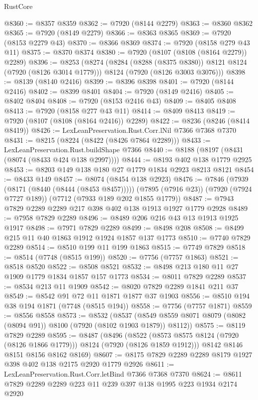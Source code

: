 \begin{lexlean}{RustCore}
\begin{coremodule}
@8360 := @8357 @8359
@8362 := @7920 (@8144 @2279)
@8363 := @8360 @8362
@8365 := @7920 (@8149 @2279)
@8366 := @8363 @8365
@8369 := @7920 (@8153 @2279 @43)
@8370 := @8366 @8369
@8374 := @7920 (@8158 @279 @43 @11)
@8375 := @8370 @8374
@8380 := @7920 (@8107 (@8108 (@8164 @2279)) @2289)
@8396 := @8253
    (@8274
      (@8284 (@8288 (@8375 @8380)) @8121 @8124 (@7920 (@8126 @3014 @1779)))
      @8124
      (@7920 (@8126 @3003 @3076)))
@8398 := @8139 (@8140 @2416)
@8399 := @8396 @8398
@8401 := @7920 (@8144 @2416)
@8402 := @8399 @8401
@8404 := @7920 (@8149 @2416)
@8405 := @8402 @8404
@8408 := @7920 (@8153 @2416 @43)
@8409 := @8405 @8408
@8413 := @7920 (@8158 @277 @43 @11)
@8414 := @8409 @8413
@8419 := @7920 (@8107 (@8108 (@8164 @2416)) @2289)
@8422 := @8236 (@8246 (@8414 @8419))
@8426 := LexLeanPreservation.Rust.Corr.lNil @7366 @7368 @7370
@8431 := @8215 (@8224 (@8422 (@8426 @7864 @2289)))
@8433 := LexLeanPreservation.Rust.buildShape @7366
@8440 := @8188 (@8197 (@8431 (@8074 (@8433 @424 @138 @2997))))
@8444 := @8193 @402 @138 @1779 @2925
@8453 := @8203 @149 @138 @180 @27 @1779 @1834 @2923 @8213 @8121
@8454 := @8433 @149
@8457 := @8074 (@8454 @138 @2923)
@8476 := @7846
    (@7939 (@8171 (@8440 (@8444 (@8453 @8457)))))
    (@7895 (@7916 @23))
    (@7920 (@7924 @7727 @189))
    (@7712 (@7933 @189 @202 @1855 @1779))
@8487 := @7943 @7829 @2289 @2289 @217 @398 @402 @138 @1913 @1927 @1779 @2928
@8489 := @7958 @7829 @2289
@8496 := @8489 @206 @216 @43 @13 @1913 @1925 @1917
@8498 := @7971 @7829 @2289
@8499 := @8498 @208
@8508 := @8499 @215 @11 @40 @1863 @1912 @1924 @1857 @137 @1773
@8510 := @7740 @7829 @2289
@8514 := @8510 @199 @11 @199 @1863
@8515 := @7749 @7829
@8518 := @8514 (@7748 (@8515 @199))
@8520 := @7756 (@7757 @1863)
@8521 := @8518 @8520
@8522 := @8508 @8521
@8532 := @8498 @213 @180 @11 @27 @1909 @1779 @1834 @1857 @157 @1773
@8534 := @8011 @7829 @2289
@8537 := @8534 @213 @11 @1909
@8542 := @8020 @7829 @2289 @1841 @211 @37
@8549 := @8542 @91 @72 @11 @1871 @1877 @37 @1903
@8556 := @8510 @194 @38 @194 @1871 (@7748 (@8515 @194))
@8558 := @7756 (@7757 @1871)
@8559 := @8556 @8558
@8573 := @8532
    (@8537 (@8549 @8559 @8071 @8079 (@8082 (@8094 @91)) @8100 (@7920 (@8102 @1903 @1879)) @8112))
@8575 := @8119 @7829 @2289
@8595 := @8487
    (@8496
      (@8522 (@8573 @8575 @8124 (@7920 (@8126 @1866 @1779))) @8124 (@7920 (@8126 @1859 @1912)))
      @8142
      @8146
      @8151
      @8156
      @8162
      @8169)
@8607 := @8175 @7829 @2289 @2289 @8179 @1927 @398 @402 @138 @2175 @2920 @1779 @2926
@8611 := LexLeanPreservation.Rust.Corr.letBind @7366 @7368 @7370
@8624 := @8611 @7829 @2289 @2289 @223 @11 @239 @397 @138 @1995 @223 @1934 @2174 @2920

\end{coremodule}
\end{lexlean}
